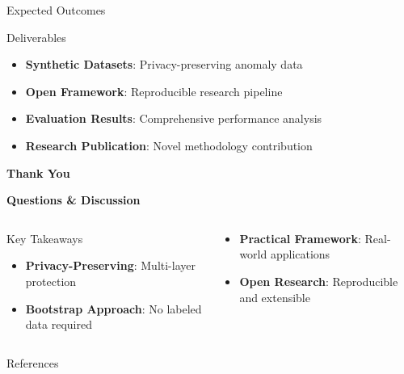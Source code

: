 \documentclass[aspectratio=169,xcolor={dvipsnames}]{beamer}
\begin{document}
\begin{frame}{Expected Outcomes}
  \begin{block}{Deliverables}
    \begin{itemize}
      \item \textbf{Synthetic Datasets}: Privacy-preserving anomaly data
      \item \textbf{Open Framework}: Reproducible research pipeline
      \item \textbf{Evaluation Results}: Comprehensive performance analysis
      \item \textbf{Research Publication}: Novel methodology contribution
    \end{itemize}
  \end{block}
\end{frame}

\begin{frame}[plain]
  \centering
  \Huge \textbf{Thank You}
  
  \vspace{0.5em}
  \Large \textbf{Questions \& Discussion}
  
  \vspace{1em}
  \begin{columns}
    \begin{column}{0.5\textwidth}
      \begin{block}{Key Takeaways}
        \begin{itemize}
          \item \textbf{Privacy-Preserving}: Multi-layer protection
          \item \textbf{Bootstrap Approach}: No labeled data required
        \end{itemize}
      \end{block}
    \end{column}
    \begin{column}{0.5\textwidth}
      \begin{block}{}
        \begin{itemize}
          \item \textbf{Practical Framework}: Real-world applications
          \item \textbf{Open Research}: Reproducible and extensible
        \end{itemize}
      \end{block}
    \end{column}
  \end{columns}
\end{frame}

\begin{frame}[allowframebreaks]{References}
  \printbibliography
\end{frame}
\end{document}
